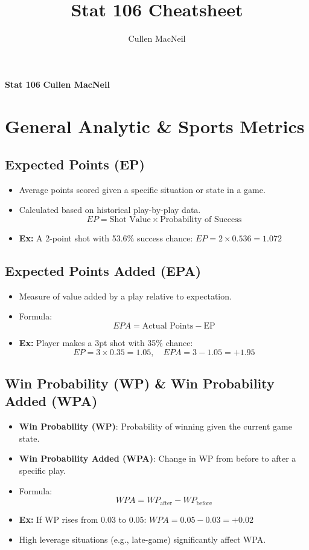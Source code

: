 \documentclass[10pt, landscape]{article}
\title{Stat 106 Cheatsheet}
\author{Cullen MacNeil}
\begin{document}
\begin{multicols}{3}

\begin{center}
    \textbf{Stat 106}
    \textbf{Cullen MacNeil}
\end{center}

\section{General Analytic \& Sports Metrics}

\subsection{Expected Points (EP)}
\begin{itemize}[noitemsep]
    \item Average points scored given a specific situation or state in a game.
    \item Calculated based on historical play-by-play data.
    \[ EP = \text{Shot Value} \times \text{Probability of Success} \]
    \item \textbf{Ex:} A 2-point shot with 53.6\% success chance: \(EP = 2 \times 0.536 = 1.072\)
\end{itemize}

\subsection{Expected Points Added (EPA)}
\begin{itemize}[noitemsep]
    \item Measure of value added by a play relative to expectation.
    \item Formula:
    \[ EPA = \text{Actual Points} - \text{EP} \]
    \item \textbf{Ex:} Player makes a 3pt shot with 35\% chance:
    \[ EP = 3 \times 0.35 = 1.05,\quad EPA = 3 - 1.05 = +1.95 \]
\end{itemize}

\subsection{Win Probability (WP) \& Win Probability Added (WPA)}
\begin{itemize}[noitemsep]
    \item \textbf{Win Probability (WP)}: Probability of winning given the current game state.
    \item \textbf{Win Probability Added (WPA)}: Change in WP from before to after a specific play.
    \item Formula:
    \[ WPA = WP_{\text{after}} - WP_{\text{before}} \]
    \item \textbf{Ex:} If WP rises from 0.03 to 0.05: \(WPA = 0.05 - 0.03 = +0.02\)
    \item High leverage situations (e.g., late-game) significantly affect WPA.
\end{itemize}


\end{multicols}
\end{document}
